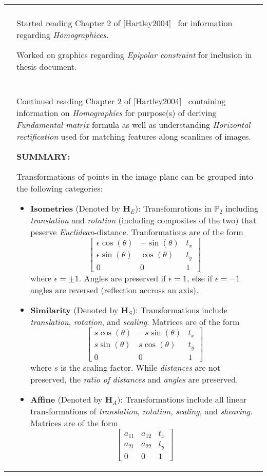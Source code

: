 \documentclass[a4paper,10pt]{article}
\newcommand{\logentry}[4]{\hline\\[-0.25ex]\selectlanguage{USenglish}\formatdate{#2}{#1}{#3}&{#4}\par\\[-0.25ex]}
\newcommand{\SUMMARY}[1]{%
	{\noindent\textbf{\color{blue}SUMMARY: }{\noindent #1} \noindent}
}
\begin{document}
\begin{longtable}{l p{12cm} }
{	}
	\logentry{6}{26}{2016}{%
Started reading Chapter 2 of [Hartley2004]~\cite{Hartley2004} for information regarding \textit{Homographices}.\newline
\par Worked on graphics regarding \textit{Epipolar constraint} for inclusion in thesis document.
	}
	\logentry{6}{27}{2016}{%
Continued reading Chapter 2 of [Hartley2004]~\cite{Hartley2004} containing information on \textit{Homographies} for purpose(s) of deriving \textit{Fundamental matrix} formula as well as understanding \textit{Horizontal rectification} used for matching features along scanlines of images.\newline
\par \SUMMARY{
Transformations of points in the image plane can be grouped into the following categories:
\begin{itemize}
\item \textbf{Isometries} (Denoted by $\mathbf{H}_E$): Transfomrations in $\mathbb{P}_2$ including \textit{translation} and  \textit{rotation} (including composites of the two) that peserve \textit{Euclidean}-distance. Tranformations are of the form
\begin{equation*}
\begin{bmatrix}\epsilon\cos(\theta) & -\sin(\theta) & t_x \\ \epsilon\sin(\theta) & \cos(\theta) & t_y \\ 0 & 0 & 1 \end{bmatrix}
\end{equation*}
where $\epsilon=\pm 1$. Angles are preserved if $\epsilon=1$, else if $\epsilon=-1$ angles are reversed (reflection accross an axis).
\item \textbf{Similarity} (Denoted by $\mathbf{H}_S$): Transformations include \textit{translation}, \textit{rotation}, and \textit{scaling}. Matrices are of the form
\begin{equation*}
\begin{bmatrix}s\cos(\theta) & -s\sin(\theta) & t_x \\ s\sin(\theta) & s\cos(\theta) & t_y \\ 0 & 0 & 1 \end{bmatrix}
\end{equation*}
where $s$ is the scaling factor. While \textit{distances} are not preserved, the \textit{ratio of distances} and \textit{angles} are preserved.
\item \textbf{Affine} (Denoted by $\mathbf{H}_A$): Transformations include all linear transformations of \textit{translation}, \textit{rotation}, \textit{scaling}, and \textit{shearing}. Matrices are of the form
\begin{equation*}
\begin{bmatrix}a_{11} & a_{12} & t_x \\ a_{21} & a_{22} & t_y \\ 0 & 0 & 1 \end{bmatrix}
\end{equation*}


\end{itemize}}}
\end{longtable}
\end{document}
